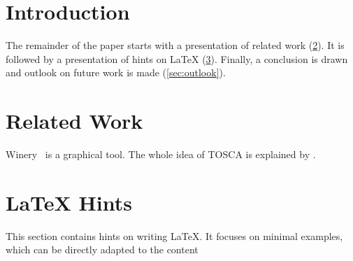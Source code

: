 
\begin{abstract}
\lipsum[1]

\end{abstract}


\section{Introduction}
\label{sec:introduction}
\lipsum[1-3]

The remainder of the paper starts with a presentation of related work (\cref{sec:relatedwork}).
It is followed by a presentation of hints on \LaTeX{} (\cref{sec:latexhints}).
Finally, a conclusion is drawn and outlook on future work is made (\cref{sec:outlook}).

\section{Related Work}
\label{sec:relatedwork}

Winery~\cite{Winery} is a graphical  tool.
The whole idea of TOSCA is explained by \citet{Binz2009}.

\section{LaTeX Hints}
\label{sec:latexhints}

\newcount\LTGbeginlineexample
\newcount\LTGendlineexample
\newenvironment{ltgexample}%
{\LTGbeginlineexample=\numexpr\inputlineno+1\relax}%
{\LTGendlineexample=\numexpr\inputlineno-1\relax%
  \tcbinputlisting{%
    listing only,
    listing file=\currfilepath,
    colback=green!5!white,
    colframe=green!25,
    coltitle=black!90,
    coltext=black!90,
    left=8mm,
    title=Corresponding \LaTeX{} code of \texttt{\currfilepath},
    listing options={
        frame=none,
        language={[LaTeX]TeX},
        escapeinside={},
        firstline=\the\LTGbeginlineexample,
        lastline=\the\LTGendlineexample,
        firstnumber=\the\LTGbeginlineexample,
        basewidth=.5em,
        aboveskip=0mm,
        belowskip=0mm,
        numbers=left,
        xleftmargin=0mm,
        numberstyle=\tiny,
        numbersep=8pt%
      }
  }
}%

This section contains hints on writing LaTeX.
It focuses on minimal examples, which can be directly adapted to the content

